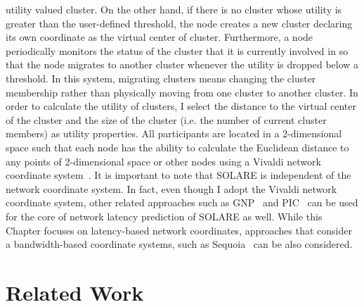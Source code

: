 utility valued cluster.
%
On the other hand, if there is no cluster whose utility is greater than
the user-defined threshold, the node creates a new cluster declaring its
own coordinate as the virtual center of cluster.
%
Furthermore, a node periodically monitors the status of the cluster that
it is currently involved in so that the node migrates to another cluster
whenever the utility is dropped below a threshold.
%
In this system, migrating clusters means changing the cluster membership
rather than physically moving from one cluster to another cluster.
%
In order to calculate the utility of clusters, I select the distance to
the virtual center of the cluster and the size of the cluster (i.e. the
number of current cluster members) as utility properties.
%
All participants are located in a 2-dimensional space such that each
node has the ability to calculate the Euclidean distance to any points
of 2-dimensional space or other nodes using a Vivaldi network coordinate
system~\cite{vivaldi}.
%
It is important to note that SOLARE is independent of the network
coordinate system.
%
In fact, even though I adopt the Vivaldi network coordinate system,
other related approaches such as GNP~\cite{gnp} and PIC~\cite{pic} can be used for the core of
network latency prediction of SOLARE as well.
%
While this Chapter focuses on latency-based network coordinates,
approaches that consider a bandwidth-based coordinate systems, such as
Sequoia~\cite{ramasu, treeness} can be also considered.
%

\section{Related Work}
\label{solare:related}
